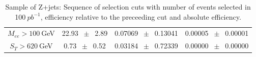 \begin{table}[htbp]
\begin{center}
\begin{tabular}{|c|c|c|c|}
          $M_{ee}>100~$GeV          &           22.93          $~\pm~$          2.89           &           0.07069          $~\pm~$          0.13041           &           0.00005          $~\pm~$          0.00001          \\          
          $ S_T>620~$GeV           &           0.73          $~\pm~$          0.52           &           0.03184          $~\pm~$          0.72339           &           0.00000          $~\pm~$          0.00000          \\          
          \hline\hline 
\end{tabular} 
\end{center} 
\caption{Sample of Z+jets: Sequence of selection cuts with number of events selected in 100$~pb^{-1}$, efficiency relative to the preceeding cut and absolute efficiency.} 
\label{tab:} 
\end{table} 

